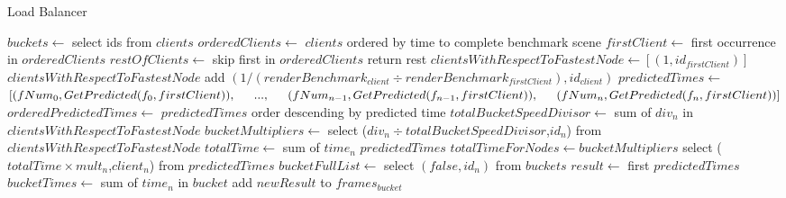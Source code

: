 ﻿\documentclass[a4paper]{article}
\begin{document}
    \setcounter{algorithm}{1}
    \begin{algorithm}
        \caption{Load Balancer}\label{alg:cap}
        \begin{algorithmic}[1]
            \State $buckets \gets$ select ids from $clients$
            \State $orderedClients \gets$ $clients$ ordered by time to complete benchmark scene
            \State $firstClient \gets$ first occurrence in $orderedClients$
            \State $restOfClients \gets$ skip first in $orderedClients$ return rest
            \State $clientsWithRespectToFastestNode \gets [(1,id_{firstClient})]$
                \State $clientsWithRespectToFastestNode $ add $(1/(renderBenchmark_{client} \div renderBenchmark_{firstClient}),id_{client})$
            \EndFor
            \State $predictedTimes \gets$ \newline \indent $[(fNum_0, GetPredicted(f_0,firstClient)), \newline \indent ..., \newline \indent (fNum_{n-1}, GetPredicted(f_{n-1},firstClient)), \newline \indent (fNum_{n}, GetPredicted(f_{n},firstClient))]$
            \State $orderedPredictedTimes \gets$ $predictedTimes$ order descending by predicted time
            \State $totalBucketSpeedDivisor \gets$ sum of $div_n$ in $clientsWithRespectToFastestNode$
            \State $bucketMultipliers \gets$ select ($div_n \div totalBucketSpeedDivisor$,$id_n$) from $clientsWithRespectToFastestNode$
            \State $totalTime \gets$ sum of $time_n$ $predictedTimes$
            \State $totalTimeForNodes \gets bucketMultipliers$ select ($totalTime \times mult_n$,$client_n$) from $predictedTimes$
            \State $bucketFullList \gets$ select $(false,id_n)$ from $buckets$
                \State $result \gets$ first $predictedTimes$
                    \State $bucketTimes \gets$ sum of $time_n$ in $bucket$
                                        \State add $newResult$ to $frames_{bucket}$

\end{algorithmic}
\end{algorithm}
\end{document}
